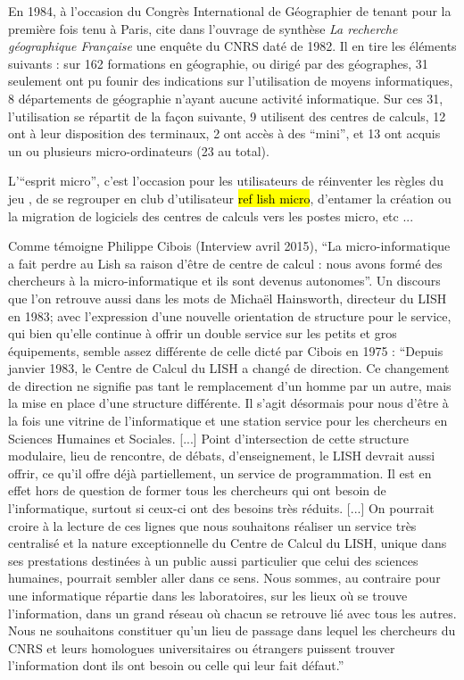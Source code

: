 En 1984, à l'occasion du Congrès International de Géographier de tenant pour la première fois tenu  à Paris, \textcite{Faugieres1984} cite dans l'ouvrage de synthèse \textit{La recherche géographique Française} une enquête du CNRS daté de 1982. Il en tire les éléments suivants : sur 162 formations en géographie, ou dirigé par des géographes, 31 seulement ont pu founir des indications sur l'utilisation de moyens informatiques, 8 départements de géographie n'ayant aucune activité informatique. Sur ces 31, l'utilisation se répartit de la façon suivante, 9 utilisent des centres de calculs, 12 ont à leur disposition des terminaux, 2 ont accès à des \enquote{mini}, et 13 ont acquis un ou plusieurs micro-ordinateurs (23 au total).

L'\enquote{esprit micro}, c'est l'occasion pour les utilisateurs de réinventer les règles du jeu , de se regrouper en club d'utilisateur \hl{ref lish micro}, d'entamer la création ou la migration de logiciels des centres de calculs vers les postes micro, etc ...

Comme témoigne Philippe Cibois (Interview avril 2015), \enquote{La micro-informatique a fait perdre au Lish sa raison d'être de centre de calcul : nous avons formé des chercheurs à la micro-informatique et ils sont devenus autonomes}. Un discours que l’on retrouve aussi dans les mots de Michaël Hainsworth, directeur du LISH en 1983; avec l’expression d’une nouvelle orientation de structure pour le service, qui bien qu’elle continue à offrir un double service sur les petits et gros équipements, semble assez différente de celle dicté par Cibois en 1975 : \enquote{Depuis janvier 1983, le Centre de Calcul du LISH a changé de direction. Ce changement de direction ne signifie pas tant le remplacement d'un homme par un autre, mais la mise en place d'une structure différente. Il s'agit désormais pour nous d'être à la fois une vitrine de l'informatique et une station service pour les chercheurs en Sciences Humaines et Sociales. [...] Point d'intersection de cette structure modulaire, lieu de rencontre, de débats, d'enseignement, le LISH devrait aussi offrir, ce qu'il offre déjà partiellement, un service de programmation. Il est en effet hors de question de former tous les chercheurs qui ont besoin de l'informatique, surtout si ceux-ci ont des besoins très réduits. [...] On pourrait croire à la lecture de ces lignes que nous souhaitons réaliser un service très centralisé et la nature exceptionnelle du Centre de Calcul du LISH, unique dans ses prestations destinées à un public aussi particulier que celui des sciences humaines, pourrait sembler aller dans ce sens. Nous sommes, au contraire pour une informatique répartie dans les laboratoires, sur les lieux où se trouve l'information, dans un grand réseau où chacun se retrouve lié avec tous les autres. Nous ne souhaitons constituer qu'un lieu de passage dans lequel les chercheurs du CNRS et leurs homologues universitaires ou étrangers puissent trouver l'information dont ils ont besoin ou celle qui leur fait défaut.}

